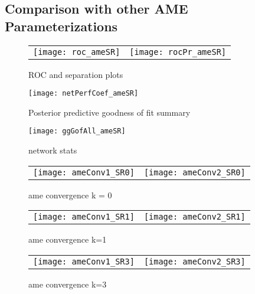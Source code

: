 \subsection{Comparison with other AME Parameterizations}



% 

\begin{figure}[ht]
	\centering
	\begin{tabular}{cc}
	\texttt{[image: roc\_ameSR]} & 
	\texttt{[image: rocPr\_ameSR]}
	\end{tabular}
	\caption{ROC and separation plots}
	\label{fig:roc_latentSpace}
\end{figure}

\begin{figure}[ht]
	\centering
	\texttt{[image: netPerfCoef\_ameSR]}
	\caption{Posterior predictive goodness of fit summary}
	\label{fig:netPerfCoef_ameSR}
\end{figure}

\begin{figure}[ht]
	\centering
	\texttt{[image: ggGofAll\_ameSR]}
	\caption{network stats }
	\label{fig:gofAll_ameSR}
\end{figure}
\FloatBarrier

\newpage
\begin{figure}[ht]
	\centering
	\begin{tabular}{cc}
	\texttt{[image: ameConv1\_SR0]} &
	\texttt{[image: ameConv2\_SR0]}
	\end{tabular}
	\caption{ame convergence k = 0}
	\label{fig:ameConv}
\end{figure}

\begin{figure}[ht]
	\centering
	\begin{tabular}{cc}
	\texttt{[image: ameConv1\_SR1]} &
	\texttt{[image: ameConv2\_SR1]}
	\end{tabular}
	\caption{ame convergence k=1}
	\label{fig:ameConv}
\end{figure}
\FloatBarrier
\newpage

\begin{figure}[ht]
	\centering
	\begin{tabular}{cc}
	\texttt{[image: ameConv1\_SR3]} &
	\texttt{[image: ameConv2\_SR3]}
	\end{tabular}
	\caption{ame convergence k=3}
	\label{fig:ameConv}
\end{figure}

